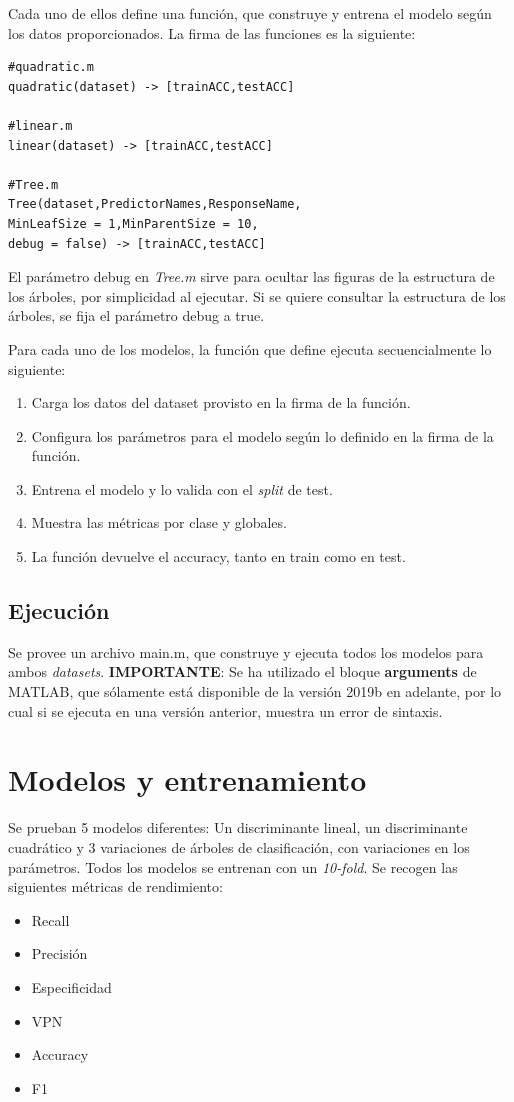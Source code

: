 \documentclass[a4paper,openwrite,12pt]{article}
\begin{document}
Cada uno de ellos define una función, que construye y entrena el modelo según los datos proporcionados. La firma de las funciones es la siguiente:

\begin{lstlisting}
#quadratic.m
quadratic(dataset) -> [trainACC,testACC]

#linear.m
linear(dataset) -> [trainACC,testACC]

#Tree.m
Tree(dataset,PredictorNames,ResponseName,
MinLeafSize = 1,MinParentSize = 10,
debug = false) -> [trainACC,testACC]
\end{lstlisting}

El parámetro debug en \textit{Tree.m} sirve para ocultar las figuras de la estructura de los árboles, por simplicidad al ejecutar. Si se quiere consultar la estructura de los árboles, se fija el parámetro debug a true.

Para cada uno de los modelos, la función que define ejecuta secuencialmente lo siguiente:

\begin{enumerate}
    \item Carga los datos del dataset provisto en la firma de la función.
    \item Configura los parámetros para el modelo según lo definido en la firma de la función.
    \item Entrena el modelo y lo valida con el \textit{split} de test.
    \item Muestra las métricas por clase y globales.
    \item La función devuelve el accuracy, tanto en train como en test.
\end{enumerate}

\subsection{Ejecución}
Se provee un archivo main.m, que construye y ejecuta todos los modelos para ambos \textit{datasets}. 
\textbf{IMPORTANTE}: Se ha utilizado el bloque \textbf{arguments} de MATLAB, que sólamente está disponible de la versión 2019b en adelante, por lo cual si se ejecuta en una versión anterior, muestra un error de sintaxis.
\section{Modelos y entrenamiento} 
Se prueban 5 modelos diferentes:
Un discriminante lineal, un discriminante cuadrático y 3 variaciones de árboles de clasificación, con variaciones en los parámetros.
Todos los modelos se entrenan con un \textit{10-fold}.
Se recogen las siguientes métricas de rendimiento:
\begin{itemize}
    \item Recall
    \item Precisión
    \item Especificidad
    \item VPN
    \item Accuracy
    \item F1
\end{itemize}
\end{document}
